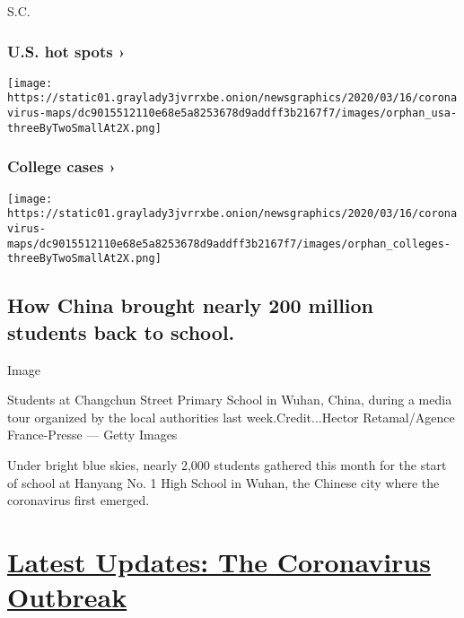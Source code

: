 S.C.

\href{https://www.nytimes3xbfgragh.onion/interactive/2020/us/coronavirus-us-cases.html}{}

\hypertarget{us-hot-spots-}{%
\subsubsection{U.S. hot spots ›}\label{us-hot-spots-}}

\texttt{[image: https://static01.graylady3jvrrxbe.onion/newsgraphics/2020/03/16/coronavirus-maps/dc9015512110e68e5a8253678d9addff3b2167f7/images/orphan\_usa-threeByTwoSmallAt2X.png]}
\href{https://www.nytimes3xbfgragh.onion/interactive/2020/us/covid-college-cases-tracker.html}{}

\hypertarget{college-cases-}{%
\subsubsection{College cases ›}\label{college-cases-}}

\texttt{[image: https://static01.graylady3jvrrxbe.onion/newsgraphics/2020/03/16/coronavirus-maps/dc9015512110e68e5a8253678d9addff3b2167f7/images/orphan\_colleges-threeByTwoSmallAt2X.png]}

\hypertarget{how-china-brought-nearly-200-million-students-back-to-school}{%
\subsection{How China brought nearly 200 million students back to
school.}\label{how-china-brought-nearly-200-million-students-back-to-school}}

Image

Students at Changchun Street Primary School in Wuhan, China, during a
media tour organized by the local authorities last week.Credit...Hector
Retamal/Agence France-Presse --- Getty Images

Under bright blue skies, nearly 2,000 students gathered this month for
the start of school at Hanyang No. 1 High School in Wuhan, the Chinese
city where the coronavirus first emerged.

\hypertarget{latest-updates-the-coronavirus-outbreak}{%
\section{\texorpdfstring{\href{https://www.nytimes3xbfgragh.onion/2020/09/11/world/covid-19-coronavirus.html?action=click\&pgtype=Article\&state=default\&region=MAIN_CONTENT_1\&context=storylines_live_updates}{Latest
Updates: The Coronavirus
Outbreak}}{Latest Updates: The Coronavirus Outbreak}}\label{latest-updates-the-coronavirus-outbreak}}

